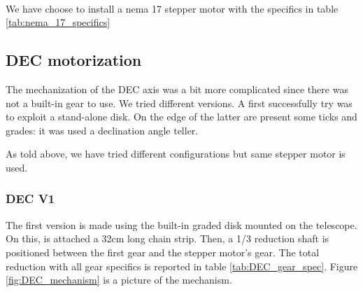 \documentclass{article}
\begin{document}
\begin{multicols}{2}
\begin{minipage}{.5\textwidth}
            \label{fig:RA_mechanization}         
        \end{minipage}
        \\
        We have choose to install a nema 17 stepper motor with the specifics in table \ref{tab:nema_17_specifics}

        \subsection{DEC motorization}
        The mechanization of the DEC axis was a bit more complicated since there was not a built-in gear to use.
        We tried different versions.
        A first successfully try was to exploit a stand-alone disk.
        On the edge of the latter are present some ticks and grades: it was used a declination angle teller.

        As told above, we have tried different configurations but same stepper motor is used.

        \subsubsection{DEC V1}
        The first version is made using the built-in graded disk mounted on the telescope.
        On this, is attached a 32cm long chain strip.
        Then, a 1/3 reduction shaft is positioned between the first gear and the stepper motor's gear.
        The total reduction with all gear specifics is reported in table \ref{tab:DEC_gear_spec}.
        Figure \ref{fig:DEC_mechanism} is a picture of the mechanism.


\end{multicols}
\end{document}
